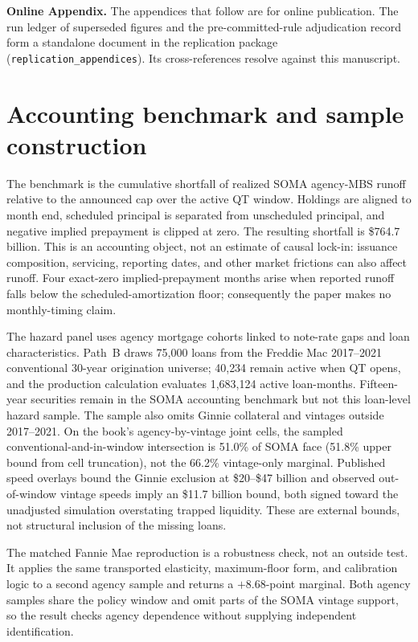 \documentclass[12pt]{article}
\begin{document}
\clearpage



\clearpage
\appendix

\noindent\textbf{Online Appendix.} The appendices that follow are for online publication. The run ledger of superseded figures and the pre-committed-rule adjudication record form a standalone document in the replication package (\texttt{replication\_appendices}). Its cross-references resolve against this manuscript.

\section{Accounting benchmark and sample construction}\label{app:benchmark}

The benchmark is the cumulative shortfall of realized SOMA agency-MBS runoff
relative to the announced cap over the active QT window. Holdings are aligned to
month end, scheduled principal is separated from unscheduled principal, and
negative implied prepayment is clipped at zero. The resulting shortfall is
\$764.7 billion. This is an accounting object, not an estimate of causal lock-in:
issuance composition, servicing, reporting dates, and other market frictions can
also affect runoff. Four exact-zero implied-prepayment months arise when reported
runoff falls below the scheduled-amortization floor; consequently the paper makes
no monthly-timing claim.

The hazard panel uses agency mortgage cohorts linked to note-rate gaps and loan
characteristics. Path~B draws 75{,}000 loans from the Freddie Mac 2017--2021
conventional 30-year origination universe; 40{,}234 remain active when QT opens,
and the production calculation evaluates 1{,}683{,}124 active loan-months.
Fifteen-year securities remain in the SOMA accounting benchmark but not this
loan-level hazard sample. The sample also omits Ginnie collateral and vintages
outside 2017--2021. On the book's agency-by-vintage joint cells, the sampled
conventional-and-in-window intersection is 51.0\% of SOMA face (51.8\% upper
bound from cell truncation), not the 66.2\% vintage-only marginal. Published
speed overlays bound the Ginnie exclusion at \$20--\$47 billion and observed
out-of-window vintage speeds imply an \$11.7 billion bound, both signed toward
the unadjusted simulation overstating trapped liquidity. These are external
bounds, not structural inclusion of the missing loans.

The matched Fannie Mae reproduction is a robustness check, not an outside test.
It applies the same transported elasticity, maximum-floor form, and calibration
logic to a second agency sample and returns a $+8.68$-point marginal. Both agency
samples share the policy window and omit parts of the SOMA vintage support, so
the result checks agency dependence without supplying independent identification.
\end{document}
